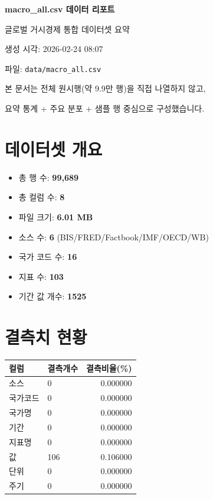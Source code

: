 \documentclass[11pt,a4paper]{article}
\begin{document}
\begin{titlepage}
\centering
\vspace*{4.0cm}
{\Huge\bfseries\color{accent} macro\_all.csv 데이터 리포트\par}
\vspace{1.2cm}
{\Large 글로벌 거시경제 통합 데이터셋 요약\par}
\vspace{2.0cm}
{\large 생성 시각: 2026-02-24 08:07\par}
\vspace{0.5cm}
{\large 파일: \texttt{data/macro\_all.csv}\par}
\vfill
{\normalsize 본 문서는 전체 원시행(약 9.9만 행)을 직접 나열하지 않고,\par
요약 통계 + 주요 분포 + 샘플 행 중심으로 구성했습니다.\par}
\end{titlepage}

\section{데이터셋 개요}
\begin{itemize}
\item 총 행 수: \textbf{99,689}
\item 총 컬럼 수: \textbf{8}
\item 파일 크기: \textbf{6.01 MB}
\item 소스 수: \textbf{6} (BIS/FRED/Factbook/IMF/OECD/WB)
\item 국가 코드 수: \textbf{16}
\item 지표 수: \textbf{103}
\item 기간 값 개수: \textbf{1525}
\end{itemize}

\section{결측치 현황}
\begin{tabular}{llr}
\toprule
컬럼 & 결측개수 & 결측비율(\%) \\
\midrule
소스 & 0 & 0.000000 \\
국가코드 & 0 & 0.000000 \\
국가명 & 0 & 0.000000 \\
기간 & 0 & 0.000000 \\
지표명 & 0 & 0.000000 \\
값 & 106 & 0.106000 \\
단위 & 0 & 0.000000 \\
주기 & 0 & 0.000000 \\
\bottomrule
\end{tabular}
\end{document}
